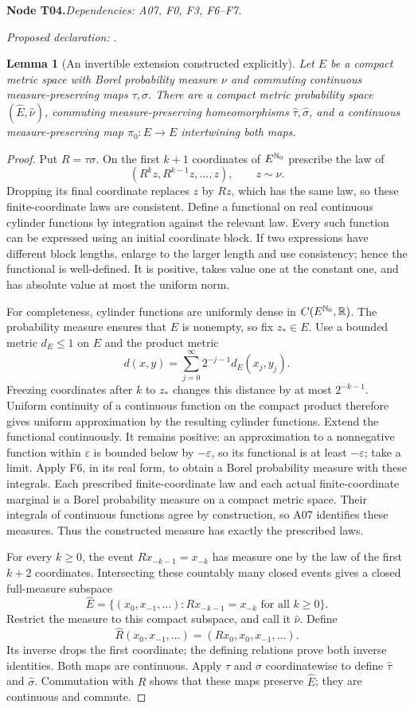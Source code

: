 \documentclass[11pt]{article}
\newtheorem{lemma}[theorem]{Lemma}
\theoremstyle{remark}\newtheorem{remark}[theorem]{Remark}
\newcommand{\R}{\mathbb R}\newcommand{\C}{\mathbb C}
\newcommand{\bpnode}[3]{\par\Needspace{5\baselineskip}\noindent\textbf{Node #1.}\quad\textit{Dependencies: #2.}\par\noindent\textit{Proposed declaration:} \texttt{\detokenize{#3}}.\par\smallskip}
\begin{document}
\bpnode{T04}{A07, F0, F3, F6--F7}{commuting_compact_natural_extension}
\begin{lemma}[An invertible extension constructed explicitly]\label{lem:natural-extension}
Let $E$ be a compact metric space with Borel probability measure $\nu$ and commuting continuous measure-preserving maps $\tau,\sigma$. There are a compact metric probability space $(\widehat E,\widehat\nu)$, commuting measure-preserving homeomorphisms $\widehat\tau,\widehat\sigma$, and a continuous measure-preserving map $\pi_0:\widehat E\to E$ intertwining both maps.
\end{lemma}
\begin{proof}
Put $R=\tau\sigma$. On the first $k+1$ coordinates of $E^{\mathbb N_0}$ prescribe the law of
\[
 (R^kz,R^{k-1}z,\ldots,z),\qquad z\sim\nu.
\]
Dropping its final coordinate replaces $z$ by $Rz$, which has the same law, so these finite-coordinate laws are consistent. Define a functional on real continuous cylinder functions by integration against the relevant law. Every such function can be expressed using an initial coordinate block. If two expressions have different block lengths, enlarge to the larger length and use consistency; hence the functional is well-defined. It is positive, takes value one at the constant one, and has absolute value at most the uniform norm.

For completeness, cylinder functions are uniformly dense in $C(E^{\N_0},\R)$. The probability measure ensures that $E$ is nonempty, so fix $z_*\in E$. Use a bounded metric $d_E\le1$ on $E$ and the product metric
\[
 d(x,y)=\sum_{j=0}^\infty2^{-j-1}d_E(x_j,y_j).
\]
Freezing coordinates after $k$ to $z_*$ changes this distance by at most $2^{-k-1}$. Uniform continuity of a continuous function on the compact product therefore gives uniform approximation by the resulting cylinder functions. Extend the functional continuously. It remains positive: an approximation to a nonnegative function within $\varepsilon$ is bounded below by $-\varepsilon$, so its functional is at least $-\varepsilon$; take a limit. Apply F6, in its real form, to obtain a Borel probability measure with these integrals. Each prescribed finite-coordinate law and each actual finite-coordinate marginal is a Borel probability measure on a compact metric space. Their integrals of continuous functions agree by construction, so A07 identifies these measures. Thus the constructed measure has exactly the prescribed laws.

For every $k\ge0$, the event $R x_{-k-1}=x_{-k}$ has measure one by the law of the first $k+2$ coordinates. Intersecting these countably many closed events gives a closed full-measure subspace
\[
 \widehat E=\{(x_0,x_{-1},\ldots):Rx_{-k-1}=x_{-k}\text{ for all }k\ge0\}.
\]
Restrict the measure to this compact subspace, and call it $\widehat\nu$. Define
\[
 \widehat R(x_0,x_{-1},\ldots)=(Rx_0,x_0,x_{-1},\ldots).
\]
Its inverse drops the first coordinate; the defining relations prove both inverse identities. Both maps are continuous. Apply $\tau$ and $\sigma$ coordinatewise to define $\widehat\tau$ and $\widehat\sigma$. Commutation with $R$ shows that these maps preserve $\widehat E$; they are continuous and commute.


\end{proof}
\end{document}
